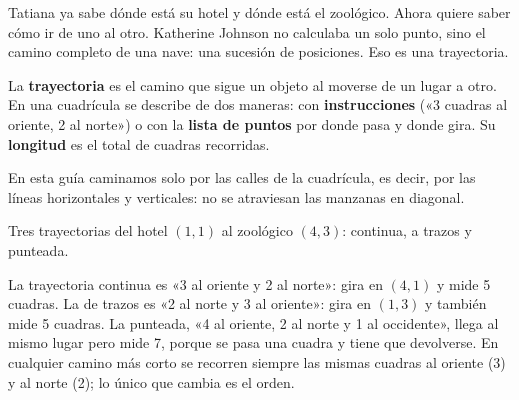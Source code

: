 \documentclass[11pt]{article}
\newcommand{\ejes}[2]{%
  \draw[gray!45] (0,0) grid (#1,#2);
  \draw[->, thick] (0,0) -- (#1+0.5,0) node[right, font=\small] {$x$};
  \draw[->, thick] (0,0) -- (0,#2+0.5) node[above, font=\small] {$y$};
  \foreach \i in {1,...,#1}
    \node[below, font=\scriptsize, text height=1.5ex, text depth=0.25ex] at (\i,0) {\i};
  \foreach \j in {1,...,#2} \node[left, font=\scriptsize] at (0,\j) {\j};
  \node[below left, font=\scriptsize] at (0,0) {0};}
\begin{document}
\label{tema:trayectorias}

\begin{hilo}
Tatiana ya sabe dónde está su hotel y dónde está el zoológico. Ahora quiere saber cómo ir de uno
al otro. Katherine Johnson no calculaba un solo punto, sino el camino completo de una nave: una
sucesión de posiciones. Eso es una trayectoria.
\end{hilo}

\begin{definicion}[Trayectoria]
La \textbf{trayectoria} es el camino que sigue un objeto al moverse de un lugar a otro. En una
cuadrícula se describe de dos maneras: con \textbf{instrucciones} («3 cuadras al oriente, 2 al
norte») o con la \textbf{lista de puntos} por donde pasa y donde gira. Su \textbf{longitud} es
el total de cuadras recorridas.
\end{definicion}

En esta guía caminamos solo por las calles de la cuadrícula, es decir, por las líneas
horizontales y verticales: no se atraviesan las manzanas en diagonal.

\begin{center}

{\footnotesize Tres trayectorias del hotel $(1, 1)$ al zoológico $(4, 3)$: continua, a trazos y
punteada.}
\end{center}

\begin{ejemplo}
La trayectoria continua es «3 al oriente y 2 al norte»: gira en $(4, 1)$ y mide 5 cuadras. La de
trazos es «2 al norte y 3 al oriente»: gira en $(1, 3)$ y también mide 5 cuadras. La punteada,
«4 al oriente, 2 al norte y 1 al occidente», llega al mismo lugar pero mide 7, porque se pasa una
cuadra y tiene que devolverse. En cualquier camino más corto se recorren siempre las mismas
cuadras al oriente (3) y al norte (2); lo único que cambia es el orden.
\end{ejemplo}
\end{document}
